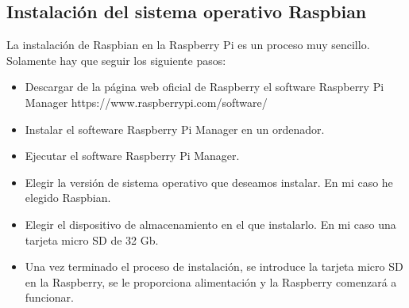     \subsection{Instalación del sistema operativo Raspbian}
    La instalación de Raspbian en la Raspberry Pi es un proceso muy sencillo. Solamente hay que seguir los siguiente pasos:    
        \begin{itemize}
            \item Descargar de la página web oficial de Raspberry el software Raspberry Pi Manager
            https://www.raspberrypi.com/software/
            \item Instalar el softeware Raspberry Pi Manager en un ordenador.
            \item Ejecutar el software Raspberry Pi Manager.
            \item Elegir la versión de sistema operativo que deseamos instalar. En mi caso he elegido Raspbian.
            \item Elegir el dispositivo de almacenamiento en el que instalarlo. En mi caso una tarjeta micro SD de 32 Gb.
            \item Una vez terminado el proceso de instalación, se introduce la tarjeta micro SD en la Raspberry, se le proporciona alimentación y la Raspberry comenzará a funcionar. 
        \end{itemize}

